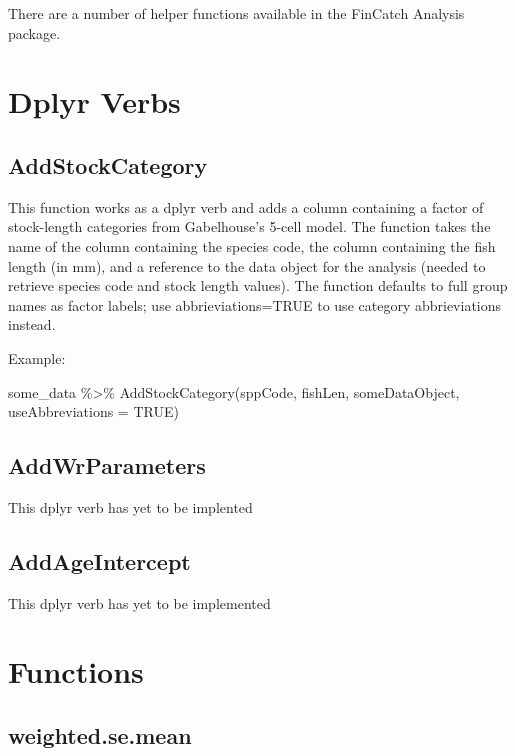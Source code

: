 \documentclass[
  letterpaper,
  DIV=11,
  numbers=noendperiod]{scrreprt}
\newenvironment{Shaded}{\begin{snugshade}}{\end{snugshade}}
\newcommand{\AttributeTok}[1]{\textcolor[rgb]{0.40,0.45,0.13}{#1}}
\newcommand{\ConstantTok}[1]{\textcolor[rgb]{0.56,0.35,0.01}{#1}}
\newcommand{\FunctionTok}[1]{\textcolor[rgb]{0.28,0.35,0.67}{#1}}
\newcommand{\NormalTok}[1]{\textcolor[rgb]{0.00,0.23,0.31}{#1}}
\newcommand{\SpecialCharTok}[1]{\textcolor[rgb]{0.37,0.37,0.37}{#1}}
\begin{document}
There are a number of helper functions available in the FinCatch
Analysis package.

\section{Dplyr Verbs}\label{dplyr-verbs}

\subsection{AddStockCategory}\label{addstockcategory}

This function works as a dplyr verb and adds a column containing a
factor of stock-length categories from Gabelhouse's 5-cell model. The
function takes the name of the column containing the species code, the
column containing the fish length (in mm), and a reference to the data
object for the analysis (needed to retrieve species code and stock
length values). The function defaults to full group names as factor
labels; use abbrieviations=TRUE to use category abbrieviations instead.

Example:

\begin{Shaded}
\begin{Highlighting}[]
\NormalTok{some\_data }\SpecialCharTok{\%\textgreater{}\%}
  \FunctionTok{AddStockCategory}\NormalTok{(sppCode, fishLen, someDataObject, }\AttributeTok{useAbbreviations =} \ConstantTok{TRUE}\NormalTok{) }
\end{Highlighting}
\end{Shaded}

\subsection{AddWrParameters}\label{addwrparameters}

This dplyr verb has yet to be implented

\subsection{AddAgeIntercept}\label{addageintercept}

This dplyr verb has yet to be implemented

\section{Functions}\label{functions}

\subsection{weighted.se.mean}\label{weighted.se.mean}
\end{document}
